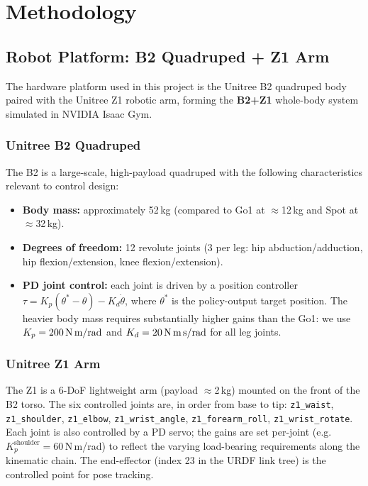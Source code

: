 
\chapter{Methodology} \label{chp:method}

\section{Robot Platform: B2 Quadruped + Z1 Arm}

The hardware platform used in this project is the Unitree B2 quadruped body
paired with the Unitree Z1 robotic arm, forming the \textbf{B2+Z1} whole-body
system simulated in NVIDIA Isaac Gym.

\subsection{Unitree B2 Quadruped}

The B2 is a large-scale, high-payload quadruped with the following characteristics
relevant to control design:
\begin{itemize}
  \item \textbf{Body mass:} approximately 52\,kg (compared to Go1 at $\approx$12\,kg
        and Spot at $\approx$32\,kg).
  \item \textbf{Degrees of freedom:} 12 revolute joints (3 per leg: hip abduction/adduction,
        hip flexion/extension, knee flexion/extension).
  \item \textbf{PD joint control:} each joint is driven by a position controller
        $\tau = K_p(\theta^* - \theta) - K_d\dot{\theta}$, where $\theta^*$ is the
        policy-output target position.  The heavier body mass requires substantially
        higher gains than the Go1: we use $K_p = 200\,\text{N\,m/rad}$ and
        $K_d = 20\,\text{N\,m\,s/rad}$ for all leg joints.
\end{itemize}

\subsection{Unitree Z1 Arm}

The Z1 is a 6-DoF lightweight arm (payload $\approx$2\,kg) mounted on the front
of the B2 torso.
The six controlled joints are, in order from base to tip:
\texttt{z1\_waist}, \texttt{z1\_shoulder}, \texttt{z1\_elbow},
\texttt{z1\_wrist\_angle}, \texttt{z1\_forearm\_roll},
\texttt{z1\_wrist\_rotate}.
Each joint is also controlled by a PD servo; the gains are set per-joint
(e.g.\ $K_p^{\text{shoulder}}=60$\,N\,m/rad) to reflect the varying
load-bearing requirements along the kinematic chain.
The end-effector (index 23 in the URDF link tree) is the controlled point for
pose tracking.

